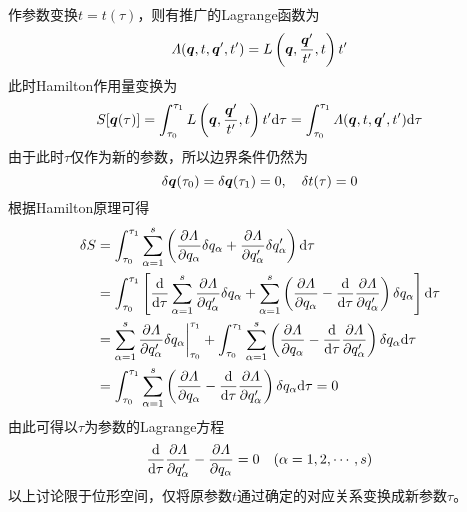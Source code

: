 作参数变换$t = t(\tau)$，则有推广的Lagrange函数为
\begin{equation*}
	\mathnormal{\Lambda} (\boldsymbol{q},t,\boldsymbol{q}',t') = L \left(\boldsymbol{q}, \frac{\boldsymbol{q}'}{t'},t\right) t'
\end{equation*}
此时Hamilton作用量变换为
\begin{equation}
	S[\boldsymbol{q}(\tau)] = \int_{\tau_0}^{\tau_1} L\left(\boldsymbol{q},\frac{\boldsymbol{q}'}{t'},t\right) t' \mathrm{d} \tau = \int_{\tau_0}^{\tau_1} \mathnormal{\Lambda} (\boldsymbol{q},t,\boldsymbol{q}',t') \mathrm{d} \tau
\end{equation}
由于此时$\tau$仅作为新的参数，所以边界条件仍然为
\begin{equation*}
	\delta \boldsymbol{q}(\tau_0) = \delta \boldsymbol{q}(\tau_1) = 0,\quad \delta t(\tau) = 0
\end{equation*}
根据Hamilton原理可得
\begin{align}
	\delta S & = \int_{\tau_0}^{\tau_1} \sum_{\alpha=1}^s \left(\frac{\partial \mathnormal{\Lambda}}{\partial q_\alpha} \delta q_\alpha + \frac{\partial \mathnormal{\Lambda}}{\partial q'_\alpha} \delta q'_\alpha\right) \mathrm{d} \tau \nonumber \\
	& = \int_{\tau_0}^{\tau_1} \left[\frac{\mathrm{d}}{\mathrm{d} \tau} \sum_{\alpha=1}^s \frac{\partial \mathnormal{\Lambda}}{\partial q'_\alpha} \delta q_\alpha + \sum_{\alpha=1}^s \left(\frac{\partial \mathnormal{\Lambda}}{\partial q_\alpha} - \frac{\mathrm{d}}{\mathrm{d} \tau} \frac{\partial \mathnormal{\Lambda}}{\partial q'_\alpha}\right) \delta q_\alpha \right] \mathrm{d} \tau \nonumber \\
	& = \sum_{\alpha=1}^s \frac{\partial \mathnormal{\Lambda}}{\partial q'_\alpha} \delta q_\alpha\bigg|_{\tau_0}^{\tau_1} + \int_{\tau_0}^{\tau_1} \sum_{\alpha=1}^s \left(\frac{\partial \mathnormal{\Lambda}}{\partial q_\alpha} - \frac{\mathrm{d}}{\mathrm{d} \tau} \frac{\partial \mathnormal{\Lambda}}{\partial q'_\alpha}\right) \delta q_\alpha \mathrm{d} \tau \nonumber \\
	& = \int_{\tau_0}^{\tau_1} \sum_{\alpha=1}^s \left(\frac{\partial \mathnormal{\Lambda}}{\partial q_\alpha} - \frac{\mathrm{d}}{\mathrm{d} \tau} \frac{\partial \mathnormal{\Lambda}}{\partial q'_\alpha}\right) \delta q_\alpha \mathrm{d} \tau = 0
\end{align}
由此可得以$\tau$为参数的Lagrange方程
\begin{equation}
	\frac{\mathrm{d}}{\mathrm{d} \tau} \frac{\partial \mathnormal{\Lambda}}{\partial q'_\alpha} - \frac{\partial \mathnormal{\Lambda}}{\partial q_\alpha} = 0 \quad (\alpha = 1,2,\cdots,s)
\end{equation}
以上讨论限于位形空间，仅将原参数$t$通过确定的对应关系变换成新参数$\tau$。

